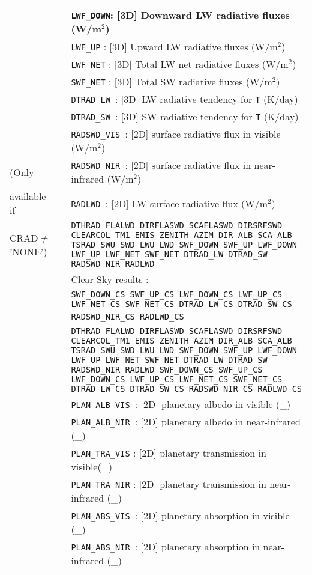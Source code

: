 \begin{center}
\begin{tabular}{|>{\centering}p{3cm}|>{\centering}p{2.5cm}|p{11cm}|}
& & {\tt LWF\_DOWN}: [3D] Downward LW radiative fluxes (W/m$^2$)\\\cline{3-3}
& & {\tt LWF\_UP} : [3D] Upward LW radiative fluxes (W/m$^2$)\\\cline{3-3}
& & {\tt LWF\_NET} : [3D] Total LW net radiative fluxes (W/m$^2$)\\\cline{3-3}
& & {\tt SWF\_NET} : [3D] Total SW radiative fluxes (W/m$^2$)\\\cline{3-3}
& & {\tt DTRAD\_LW }: [3D] LW radiative tendency for {\tt T} (K/day)\\\cline{3-3}
& & {\tt DTRAD\_SW }: [3D] SW radiative tendency for {\tt T} (K/day)\\\cline{3-3}
& & {\tt RADSWD\_VIS }: [2D] surface radiative flux in visible (W/m$^2$)\\\cline{3-3}
(Only& & {\tt RADSWD\_NIR }: [2D] surface radiative flux in near-infrared (W/m$^2$)\\\cline{3-3}
available if & & {\tt RADLWD }: [2D] LW surface radiative flux (W/m$^2$)\\\cline{2-3}
CRAD$\neq$'NONE')&\multirow{8}{*}{2} & {\tt DTHRAD FLALWD DIRFLASWD SCAFLASWD DIRSRFSWD CLEARCOL\_TM1 EMIS ZENITH AZIM DIR\_ALB SCA\_ALB TSRAD SWU SWD LWU LWD SWF\_DOWN SWF\_UP LWF\_DOWN LWF\_UP LWF\_NET SWF\_NET DTRAD\_LW DTRAD\_SW RADSWD\_NIR RADLWD }\\\cline{3-3}
&& Clear Sky results :\\
& &{\tt SWF\_DOWN\_CS SWF\_UP\_CS LWF\_DOWN\_CS LWF\_UP\_CS LWF\_NET\_CS SWF\_NET\_CS DTRAD\_LW\_CS DTRAD\_SW\_CS RADSWD\_NIR\_CS RADLWD\_CS }\ \\\cline{2-3}
&\multirow{13}{*}{3} &{\tt DTHRAD FLALWD DIRFLASWD SCAFLASWD DIRSRFSWD CLEARCOL\_TM1 EMIS ZENITH AZIM DIR\_ALB SCA\_ALB TSRAD SWU SWD LWU LWD SWF\_DOWN SWF\_UP LWF\_DOWN LWF\_UP LWF\_NET SWF\_NET DTRAD\_LW DTRAD\_SW RADSWD\_NIR RADLWD SWF\_DOWN\_CS SWF\_UP\_CS LWF\_DOWN\_CS LWF\_UP\_CS LWF\_NET\_CS SWF\_NET\_CS DTRAD\_LW\_CS DTRAD\_SW\_CS RADSWD\_NIR\_CS RADLWD\_CS  }  \\\cline{3-3}
& & {\tt PLAN\_ALB\_VIS }: [2D] planetary albedo in visible (\_) \\\cline{3-3}
& & {\tt PLAN\_ALB\_NIR }: [2D] planetary albedo  in near-infrared (\_) \\\cline{3-3}
& &{\tt PLAN\_TRA\_VIS} : [2D] planetary transmission in visible(\_) \\\cline{3-3}
& &{\tt PLAN\_TRA\_NIR} : [2D] planetary transmission in near-infrared (\_) \\\cline{3-3}
& & {\tt PLAN\_ABS\_VIS }: [2D]  planetary absorption in visible (\_)\\\cline{3-3}
& & {\tt PLAN\_ABS\_NIR }: [2D]  planetary absorption in  near-infrared (\_)\\\hline
\end{tabular} 
\end{center}

